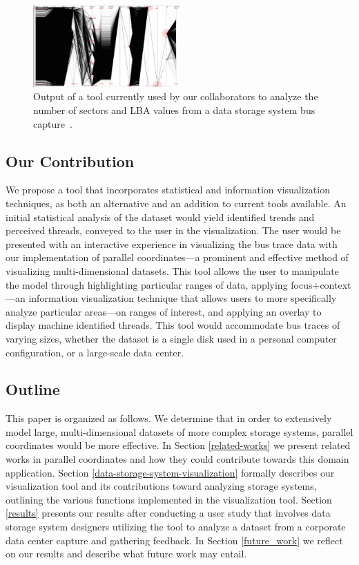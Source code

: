 \documentclass[journal]{vgtc}                %
\begin{document}
\begin{figure}[h!]
 \centering
 \includegraphics[width=0.5\textwidth]{images/prev_tool2.eps}
 \caption[Output of a tool currently used to analyze workload datasets.]{Output of a tool currently used by our collaborators to analyze the number of sectors and LBA values from a data storage system bus capture~\cite{internal:collab}.}
 \label{fig:prev_tool2}
\end{figure}

\subsection{Our Contribution}
\label{contribution}

We propose a tool that incorporates statistical and information visualization techniques, as both an alternative and an addition to current tools available.  An initial statistical analysis of the dataset would yield identified trends and perceived threads, conveyed to the user in the visualization. The user would be presented with an interactive experience in visualizing the bus trace data with our implementation of parallel coordinates---a prominent and effective method of visualizing multi-dimensional datasets. This tool allows the user to manipulate the model through highlighting particular ranges of data,  applying focus+context---an information visualization technique that allows users to more specifically analyze particular areas---on ranges of interest, and applying an overlay to display machine identified threads.  This tool would accommodate bus traces of varying sizes, whether the dataset is a single disk used in a personal computer configuration, or a large-scale data center.

\subsection{Outline}
\label{outline}
This paper is organized as follows. We determine that in order to extensively model large, multi-dimensional datasets of more complex storage systems, parallel coordinates would be more effective. In Section \ref{related-works} we present related works in parallel coordinates and how they could contribute towards this domain application. Section \ref{data-storage-system-visualization} formally describes our visualization tool and its contributions toward analyzing storage systems, outlining the various functions implemented in the visualization tool. Section \ref{results} presents our results after conducting a user study that involves data storage system designers utilizing the tool to analyze a dataset from a corporate data center capture and gathering feedback. In Section \ref{future_work} we reflect on our results and describe what future work may entail.
\end{document}
